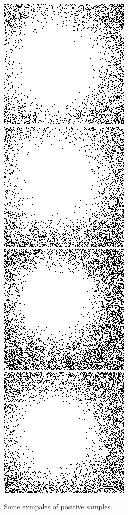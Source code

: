\documentclass[a4paper,fleqn,usenatbib]{mnras}
\begin{document}
\begin{figure}
  \includegraphics[scale=0.4]{p9.png}
  \includegraphics[scale=0.4]{p10.png}
  \includegraphics[scale=0.4]{p11.png}
  \includegraphics[scale=0.4]{p12.png}

  \caption{Some exmpales of positive samples.}
\label{ps}
\end{figure}
\end{document}
